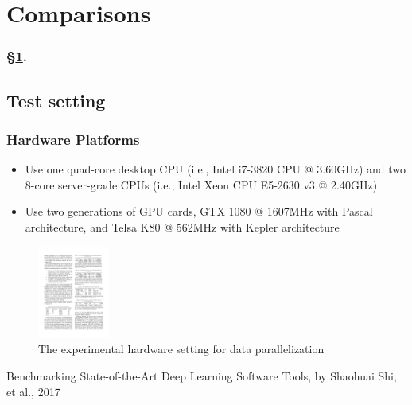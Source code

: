 
\section{Comparisons}\label{sec:numer}


\frameinlbffalse

\begin{frame}[plain]
\frametitle{\S\ref{sec:numer}. \insertsection}
\listofframes
\end{frame}
\addtocounter{framenumber}{-1} %

\frameinlbftrue


\subsection{Test setting}

\begin{frame}
	\MyLogo
	\frametitle{Hardware Platforms}  

\begin{itemize}

\item Use one quad-core desktop CPU (i.e., Intel i7-3820 CPU
		@ 3.60GHz) and two 8-core server-grade CPUs (i.e., Intel
		Xeon CPU E5-2630 v3 @ 2.40GHz)
		
\item Use two generations of GPU cards, GTX 1080 @ 1607MHz with
		Pascal architecture, and Telsa K80 @ 562MHz with Kepler
		architecture 
	\end{itemize}
	
\begin{figure}[htbp] 
	\includegraphics[height=1.2in]{figures/platforms.pdf} 
	\caption{The experimental hardware setting for data parallelization}
\end{figure}
	
\begin{center}
	{\color{red} \scriptsize
		Benchmarking State-of-the-Art Deep Learning Software Tools, by Shaohuai Shi, et al., 2017}
\end{center}

\end{frame}

